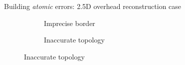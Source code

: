 \documentclass[10pt, export]{beamer}
\begin{document}
\begin{frame}{Building \textit{atomic} errors: 2.5D overhead reconstruction case}
\begin{figure}
\begin{center}
\begin{subfigure}{.28\textwidth}
                    \end{subfigure}
                    \hspace{10pt}
                    \begin{subfigure}{.28\textwidth}
                        \caption{\label{fig::bul_footprint} Imprecise border}
                    \end{subfigure}
                    \hspace{10pt}
                    \begin{subfigure}{.28\textwidth}
                        \caption{\label{fig::bul_height} Inaccurate topology}
                    \end{subfigure}
                \end{center}
            \end{figure}
        \end{frame}
\end{document}
